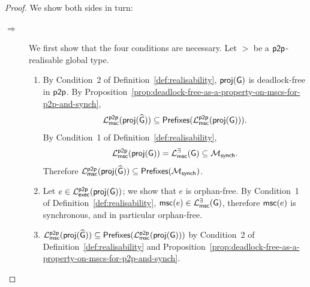\begin{proof}
We show both sides in turn:
\begin{description}
    \item[$\Rightarrow$]
    We first show that the four conditions are necessary.
    Let $\gt$ be a $\mathsf{p2p}$-realisable global type.
    \begin{enumerate}
        \item        
            By Condition~2 of Definition~\ref{def:realisability},
            $\mathsf{proj}(\mathsf{G})$ is deadlock-free in $\mathsf{p2p}$.
            By Proposition~\ref{prop:deadlock-free-as-a-property-on-mscs-for-p2p-and-synch},
            $$
                \mathcal{L}_{\mathsf{msc}}^{\mathsf{p2p}}(\mathsf{proj}(\widehat{\mathsf{G}}))\subseteq\mathsf{Prefixes}(\mathcal{L}_{\mathsf{msc}}^{\mathsf{p2p}}(\mathsf{proj}(\mathsf{G}))).
            $$
            By Condition~1 of Definition~\ref{def:realisability},
            $$
                \mathcal{L}_{\mathsf{msc}}^{\mathsf{p2p}}(\mathsf{proj}(\mathsf{G})) = \mathcal{L}_{\mathsf{msc}}^{\exists}(\mathsf{G}) \subseteq \mathcal{M}_{\mathsf{synch}}.
            $$
            Therefore $\mathcal{L}_{\mathsf{msc}}^{\mathsf{p2p}}(\mathsf{proj}(\widehat{\mathsf{G}}))\subseteq\mathsf{Prefixes}(\mathcal{M}_{\mathsf{synch}})$.
   
        \item Let $e\in\mathcal{L}_{\mathsf{exec}}^{\mathsf{p2p}}(\mathsf{proj}(\mathsf{G}))$;
        we show that $e$ is orphan-free.
        By Condition~1 of Definition~\ref{def:realisability},
        $\mathsf{msc}(e)\in\mathcal{L}_{\mathsf{msc}}^{\exists}(\mathsf{G})$, therefore
        $\mathsf{msc}(e)$ is synchronous, and in particular orphan-free.
       
        \item $\mathcal{L}_{\mathsf{msc}}^{\mathsf{p2p}}(\mathsf{proj}(\widehat{\mathsf{G}}))\subseteq\mathsf{Prefixes}(\mathcal{L}_{\mathsf{msc}}^{\mathsf{p2p}}(\mathsf{proj}(\mathsf{G})))$ 
            by Condition~2 of Definition~\ref{def:realisability} and Proposition~\ref{prop:deadlock-free-as-a-property-on-mscs-for-p2p-and-synch}.


\end{enumerate}
\end{description}
\end{proof}
